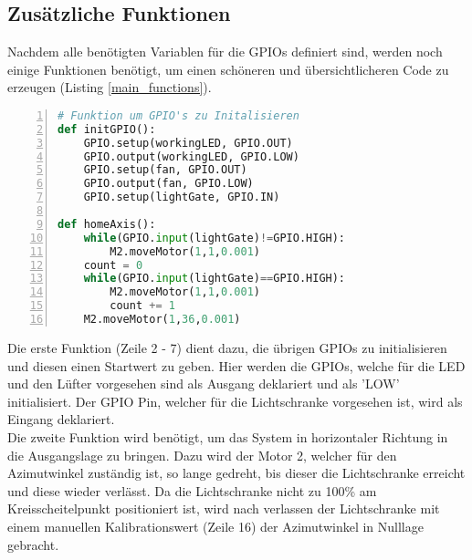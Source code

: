 \subsection{Zusätzliche Funktionen}
Nachdem alle benötigten Variablen für die \acp{GPIO} definiert sind, werden noch einige Funktionen benötigt, um einen schöneren und übersichtlicheren Code zu erzeugen (Listing \ref{main_functions}). 
\begin{lstlisting}[caption={Funktionen für die Übersichtlichkeit des Codes}, language={Python}, label={main_functions}, numbers=left]
# Funktion um GPIO's zu Initalisieren
def initGPIO():
    GPIO.setup(workingLED, GPIO.OUT)
    GPIO.output(workingLED, GPIO.LOW)
    GPIO.setup(fan, GPIO.OUT)
    GPIO.output(fan, GPIO.LOW)
    GPIO.setup(lightGate, GPIO.IN)

def homeAxis():
    while(GPIO.input(lightGate)!=GPIO.HIGH):
        M2.moveMotor(1,1,0.001)
    count = 0
    while(GPIO.input(lightGate)==GPIO.HIGH):
        M2.moveMotor(1,1,0.001)
        count += 1
    M2.moveMotor(1,36,0.001)
\end{lstlisting}
Die erste Funktion (Zeile 2 - 7) dient dazu, die übrigen \acp{GPIO} zu initialisieren und diesen einen Startwert zu geben. Hier werden die \acp{GPIO}, welche für die LED und den Lüfter vorgesehen sind als Ausgang deklariert und als 'LOW' initialisiert. Der \ac{GPIO} Pin, welcher für die Lichtschranke vorgesehen ist, wird als Eingang deklariert.\\
Die zweite Funktion wird benötigt, um das System in horizontaler Richtung in die Ausgangslage zu bringen. Dazu wird der Motor 2, welcher für den Azimutwinkel zuständig ist, so lange gedreht, bis dieser die Lichtschranke erreicht und diese wieder verlässt. Da die Lichtschranke nicht zu 100\% am Kreisscheitelpunkt positioniert ist, wird nach verlassen der Lichtschranke mit einem manuellen Kalibrationswert (Zeile 16) der Azimutwinkel in Nulllage gebracht.\\
